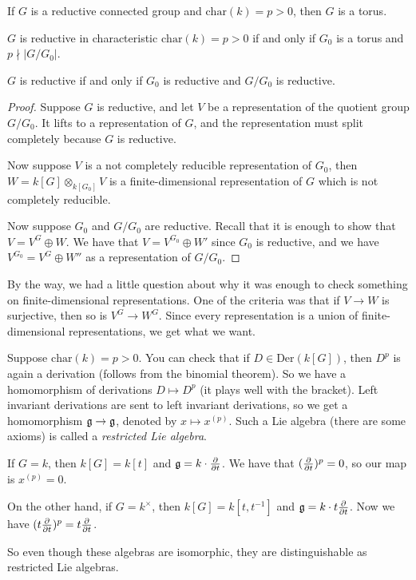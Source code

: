 \begin{corollary}
 If $G$ is a reductive connected group and $\mathrm{char}(k)=p>0$, then $G$ is a torus.
\end{corollary}
\begin{theorem}
 $G$ is reductive in characteristic $\mathrm{char}(k)=p>0$ if and only if $G_0$ is a torus and $p\nmid |G/G_0|$.
\end{theorem}
\begin{proposition}
 $G$ is reductive if and only if $G_0$ is reductive and $G/G_0$ is reductive.
\end{proposition}
\begin{proof}
 Suppose $G$ is reductive, and let $V$ be a representation of the quotient group $G/G_0$. It lifts to a representation of $G$, and the representation must split completely because $G$ is reductive.
 
 Now suppose $V$ is a not completely reducible representation of $G_0$, then $W=k[G]\otimes_{k[G_0]}V$ is a finite-dimensional representation of $G$ which is not completely reducible. 
 
 Now suppose $G_0$ and $G/G_0$ are reductive. Recall that it is enough to show that $V=V^G\oplus W$. We have that $V=V^{G_0}\oplus W'$ since $G_0$ is reductive, and we have $V^{G_0}=V^G\oplus W''$ as a representation of $G/G_0$. 
\end{proof}
By the way, we had a little question about why it was enough to check something on finite-dimensional representations. One of the criteria was that if $V\to W$ is surjective, then so is $V^G\to W^G$. Since every representation is a union of finite-dimensional representations, we get what we want.

\begin{remark}
 Suppose $\mathrm{char}(k)=p>0$. You can check that if $D\in \mathrm{Der}(k[G])$, then $D^p$ is again a derivation (follows from the binomial theorem). So we have a homomorphism of derivations $D\mapsto D^p$ (it plays well with the bracket). Left invariant derivations are sent to left invariant derivations, so we get a homomorphism $\mathfrak{g}\to \mathfrak{g}$, denoted by $x\mapsto x^{(p)}$. Such a Lie algebra (there are some axioms) is called a \emph{restricted Lie algebra}.
\end{remark}
\begin{example}
 If $G=k$, then $k[G]=k[t]$ and $\mathfrak{g}=k\cdot\frac{\partial }{\partial t}$. We have that $(\frac{\partial }{\partial t})^p=0$, so our map is $x^{(p)}=0$.
 
 On the other hand, if $G=k^\times$, then $k[G]=k[t,t^{-1}]$ and $\mathfrak{g}=k\cdot t\frac{\partial }{\partial t}$. Now we have $(t\frac{\partial }{\partial t})^p=t\frac{\partial }{\partial t}$.
 
 So even though these algebras are isomorphic, they are distinguishable as restricted Lie algebras.
\end{example}

